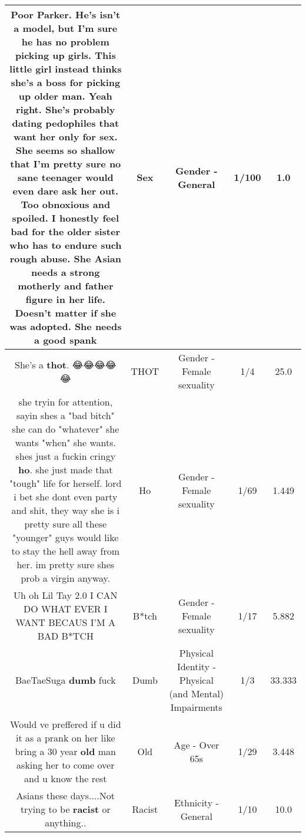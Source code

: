 \documentclass[11pt]{article}
\newlength\mylength
\begin{document}
\begin{center}
\begin{longtable}{|C{.65\mylength}|C{.30\mylength}|C{.12\mylength}|C{.12\mylength}|C{.12\mylength}|}
  \small Poor Parker. He's isn't a model, but I'm sure he has no problem picking up girls. This little girl instead thinks she's a boss for picking up older man. Yeah right. She's probably dating pedophiles that want her only for \textbf{sex}. She seems so shallow that I'm pretty sure no sane teenager would even dare ask her out. Too obnoxious and spoiled. I honestly feel bad for the older sister who has to endure such rough abuse. She Asian needs a strong motherly and father figure in her life. Doesn't matter if she was adopted. She needs a good spank\normalsize   & Sex & Gender - General & 1/100 & 1.0 \\  \hline
  \small She's a \textbf{thot}. 😂😂😂😂😂\normalsize   & THOT & Gender - Female sexuality & 1/4 & 25.0 \\  \hline
  \small she tryin for attention, sayin shes  a "bad bitch" she can do "whatever" she wants "when" she wants. shes just a fuckin cringy \textbf{ho}.  she just made that "tough" life for herself. lord  i bet she dont even party and shit, they way she is i pretty sure all these "younger" guys would like to stay the hell away from her. im pretty sure shes prob a virgin anyway.\normalsize   & Ho & Gender - Female sexuality & 1/69 & 1.449 \\  \hline
  \small Uh oh Lil Tay 2.0 I CAN DO WHAT EVER I WANT BECAUS I'M A BAD B*TCH\normalsize   & B*tch & Gender - Female sexuality & 1/17 & 5.882 \\  \hline
  \small BaeTaeSuga \textbf{dumb} fuck\normalsize   & Dumb & Physical Identity - Physical (and Mental) Impairments & 1/3 & 33.333 \\  \hline
  \small Would ve preffered if u did it as a prank on her like bring a 30 year \textbf{old} man asking her to come over and u know the rest\normalsize   & Old & Age - Over 65s & 1/29 & 3.448 \\  \hline
  \small Asians these days....Not trying to be \textbf{racist} or anything..\normalsize   & Racist & Ethnicity - General & 1/10 & 10.0 \\  \hline

\end{longtable}
\end{center}
\end{document}
